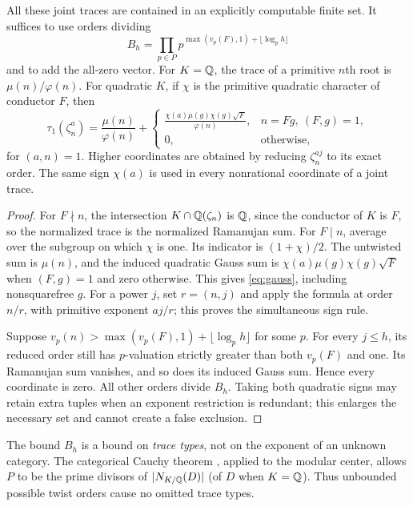 \begin{lemma}\label{lem:trace-box}
All these joint traces are contained in an explicitly computable finite
set. It suffices to use orders dividing
\begin{equation}\label{eq:trace-box}
 B_h=\prod_{p\in P}p^{\max(v_p(F),1)+\lfloor\log_p h\rfloor}
\end{equation}
and to add the all-zero vector. For $K=\mathbb Q$, the trace of a primitive
$n$th root is $\mu(n)/\varphi(n)$. For quadratic $K$, if $\chi$ is the
primitive quadratic character of conductor $F$, then
\begin{equation}\label{eq:gauss}
 \tau_1(\zeta_n^a)=\frac{\mu(n)}{\varphi(n)}+
 \begin{cases}
 \displaystyle\frac{\chi(a)\mu(g)\chi(g)\sqrt F}{\varphi(n)},
       &n=Fg,\ (F,g)=1,\\[3pt]
 0,&\text{otherwise},
 \end{cases}
\end{equation}
for $(a,n)=1$. Higher coordinates are obtained by reducing
$\zeta_n^{aj}$ to its exact order. The same sign $\chi(a)$ is used in
every nonrational coordinate of a joint trace.
\end{lemma}
\begin{proof}
For $F\nmid n$, the intersection $K\cap\mathbb Q(\zeta_n)$ is $\mathbb Q$, since the
conductor of $K$ is $F$, so the normalized trace is the normalized
Ramanujan sum. For $F\mid n$, average over the subgroup on which $\chi$
is one. Its indicator is $(1+\chi)/2$. The untwisted sum is $\mu(n)$,
and the induced quadratic Gauss sum is
$\chi(a)\mu(g)\chi(g)\sqrt F$ when $(F,g)=1$ and zero otherwise.
This gives \eqref{eq:gauss}, including nonsquarefree $g$.
For a power $j$, set $r=(n,j)$ and apply the formula at order $n/r$,
with primitive exponent $aj/r$; this proves the simultaneous sign rule.

Suppose $v_p(n)>\max(v_p(F),1)+\lfloor\log_p h\rfloor$ for some $p$.
For every $j\le h$, its reduced order still has $p$-valuation strictly
greater than both $v_p(F)$ and one. Its Ramanujan sum vanishes, and
so does its induced Gauss sum. Hence every coordinate is zero.
All other orders divide $B_h$. Taking both quadratic signs may retain
extra tuples when an exponent restriction is redundant; this enlarges
the necessary set and cannot create a false exclusion.
\end{proof}

The bound $B_h$ is a bound on \emph{trace types}, not on the exponent of
an unknown category. The categorical Cauchy theorem
\cite[Theorem 3.9]{BNRW}, applied to the modular center, allows $P$ to
be the prime divisors of $|N_{K/\mathbb Q}(D)|$ (of $D$ when $K=\mathbb Q$).
Thus unbounded possible twist orders cause no omitted trace types.


